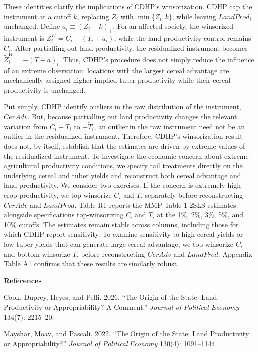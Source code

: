 \documentclass[11pt]{article}
\begin{document}
These identities clarify the implications of CDHP’s winsorization. CDHP cap the instrument at a cutoff $k$, replacing $Z_i$ with $\min\{Z_i,k\}$, while leaving $LandProd_i$ unchanged. Define $a_i \equiv (Z_i-k)_{+}$. For an affected society, the winsorized instrument is $Z^{W}_i=C_i-(T_i+a_i)$, while the land-productivity control remains $C_i$. After partialling out land productivity, the residualized instrument becomes $\widetilde{Z}^{W}_i=-\widetilde{(T+a)}_i$. Thus, CDHP’s procedure does not simply reduce the influence of an extreme observation: locations with the largest cereal advantage are mechanically assigned higher implied tuber productivity while their cereal productivity is unchanged. 

Put simply, CDHP identify outliers in the raw distribution of the instrument, $CerAdv$. But, because partialling out land productivity changes the relevant variation from $C_i-T_i$ to $-\widetilde T_i$, an outlier in the raw instrument need not be an outlier in the residualized instrument. Therefore, CDHP's winsorization result does not, by itself, establish that the estimates are driven by extreme values of the residualized instrument. To investigate the economic concern about extreme agricultural productivity conditions, we specify tail treatments directly on the underlying cereal and tuber yields and reconstruct both cereal advantage and land productivity. We consider two exercises. If the concern is extremely high crop productivity, we top-winsorize $C_i$ and $T_i$ separately before reconstructing $CerAdv$ and $LandProd$. Table R1 reports the MMP Table 1 2SLS estimates alongside specifications top-winsorizing $C_i$ and $T_i$ at the 1\%, 2\%, 3\%, 5\%, and 10\% cutoffs. The estimates remain stable across columns, including those for which CDHP report sensitivity. To examine sensitivity to high cereal yields or low tuber yields that can generate large cereal advantage, we top-winsorize $C_i$ and bottom-winsorize $T_i$ before reconstructing $CerAdv$ and $LandProd$. Appendix Table A1 confirms that these results are similarly robust.

\medskip
\noindent\textbf{References}
\smallskip

Cook, Duprey, Heyes, and Pelli. 2026.
``The Origin of the State: Land Productivity or Appropriability? A Comment.''
\textit{Journal of Political Economy} 134(7): 2215--20.

Mayshar, Moav, and Pascali. 2022.
``The Origin of the State: Land Productivity or Appropriability?''
\textit{Journal of Political Economy} 130(4): 1091--1144.
\end{document}
